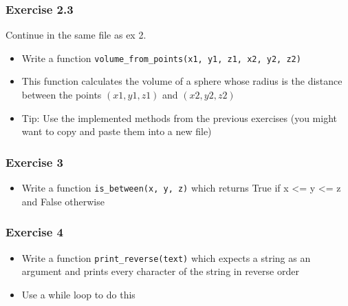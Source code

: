 \documentclass[10pt, a4paper]{beamer} %
\begin{document}
{\begin{frame}[c, fragile]
\end{frame}


\begin{frame}[c, fragile]\frametitle{Exercise 2.3}
    Continue in the same file as ex 2.
    \begin{itemize}
        \item Write a function \texttt{volume\_from\_points(x1, y1, z1, x2, y2, z2)}
        \item This function calculates the volume of a sphere whose radius is the distance between the points $(x1, y1, z1)$ and $(x2, y2, z2)$
        \item Tip: Use the implemented methods from the previous exercises (you might want to copy and paste them into a new file)
    \end{itemize}

\end{frame}

\begin{frame}[c, fragile]\frametitle{Exercise 3}
    \begin{itemize}
        \item Write a function \texttt{is\_between(x, y, z)} which returns True if x <= y <=
              z and False otherwise
    \end{itemize}

\end{frame}



\begin{frame}[c, fragile]\frametitle{Exercise 4}

    \begin{itemize}
        \item Write a function \texttt{print\_reverse(text)} which expects a string as an argument and prints every character of the string in reverse order
        \item Use a while loop to do this
    \end{itemize}
\end{frame}

}
\end{document}
